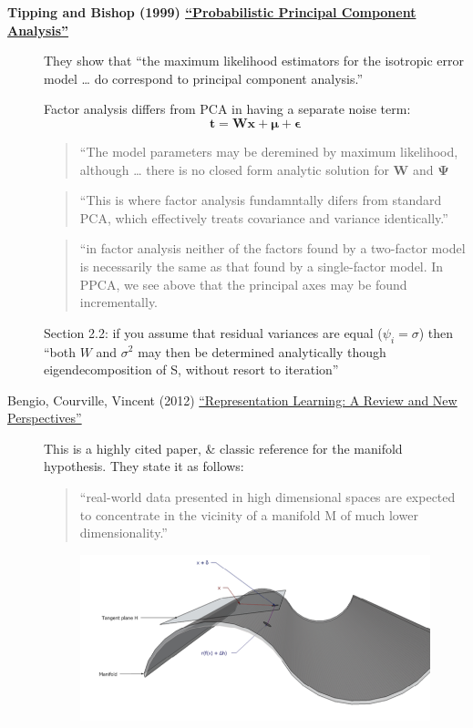 \documentclass[
  10pt,
  letterpaper,
  DIV=11,
  numbers=noendperiod,
  oneside]{scrartcl}
\newcommand{\bm}[1]{\boldsymbol{#1}}
\begin{document}
\begin{description}
\item[\textbf{Tipping and Bishop (1999)
\href{https://www.cs.columbia.edu/~blei/seminar/2020-representation/readings/TippingBishop1999.pdf}{``Probabilistic
Principal Component Analysis''}}]
They show that ``the maximum likelihood estimators for the isotropic
error model \ldots{} do correspond to principal component analysis.''

Factor analysis differs from PCA in having a separate noise term:
\[\bm{t}=\bm{W}\bm{x}+\bm{\mu}+\bm{\epsilon}\]

\begin{quote}
``The model parameters may be deremined by maximum likelihood, although
\ldots{} there is no closed form analytic solution for \(\bm{W}\) and
\(\bm{\Psi}\)
\end{quote}

\begin{quote}
``This is where factor analysis fundamntally difers from standard PCA,
which effectively treats covariance and variance identically.''
\end{quote}

\begin{quote}
``in factor analysis neither of the factors found by a two-factor model
is necessarily the same as that found by a single-factor model. In PPCA,
we see above that the principal axes may be found incrementally.
\end{quote}

Section 2.2: if you assume that residual variances are equal
(\(\psi_i=\sigma\)) then ``both \(W\) and \(\sigma^2\) may then be
determined analytically though eigendecomposition of S, without resort
to iteration''
\item[Bengio, Courville, Vincent (2012)
\href{https://arxiv.org/abs/1206.5538}{``Representation Learning: A
Review and New Perspectives''}]
This is a highly cited paper, \& classic reference for the manifold
hypothesis. They state it as follows:

\begin{quote}
``real-world data presented in high dimensional spaces are expected to
concentrate in the vicinity of a manifold M of much lower
dimensionality.''
\end{quote}

\begin{figure}[H]

{\centering \includegraphics{images/2024-09-07-06-41-40.png}

}
\end{figure}
\end{description}
\end{document}

